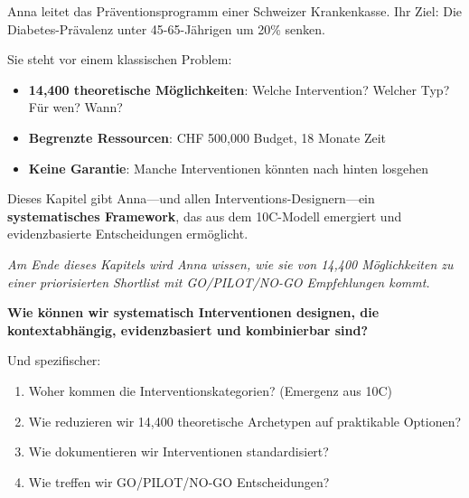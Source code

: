 \begin{tcolorbox}[colback=yellow!5!white, colframe=yellow!75!black,
    title=Intuition: Anna und das Interventions-Dilemma]

Anna leitet das Präventionsprogramm einer Schweizer Krankenkasse. Ihr Ziel: Die Diabetes-Prävalenz unter 45-65-Jährigen um 20\% senken.

Sie steht vor einem klassischen Problem:
\begin{itemize}[nosep]
\item \textbf{14,400 theoretische Möglichkeiten}: Welche Intervention? Welcher Typ? Für wen? Wann?
\item \textbf{Begrenzte Ressourcen}: CHF 500,000 Budget, 18 Monate Zeit
\item \textbf{Keine Garantie}: Manche Interventionen könnten nach hinten losgehen
\end{itemize}

Dieses Kapitel gibt Anna---und allen Interventions-Designern---ein \textbf{systematisches Framework}, das aus dem 10C-Modell emergiert und evidenzbasierte Entscheidungen ermöglicht.

\textit{Am Ende dieses Kapitels wird Anna wissen, wie sie von 14,400 Möglichkeiten zu einer priorisierten Shortlist mit GO/PILOT/NO-GO Empfehlungen kommt.}
\end{tcolorbox}

\begin{tcolorbox}[colback=red!5!white, colframe=red!75!black,
    title=Die Zentrale Frage]
\textbf{Wie können wir systematisch Interventionen designen, die kontextabhängig, evidenzbasiert und kombinierbar sind?}

Und spezifischer:
\begin{enumerate}[nosep]
\item Woher kommen die Interventionskategorien? (Emergenz aus 10C)
\item Wie reduzieren wir 14,400 theoretische Archetypen auf praktikable Optionen?
\item Wie dokumentieren wir Interventionen standardisiert?
\item Wie treffen wir GO/PILOT/NO-GO Entscheidungen?
\end{enumerate}
\end{tcolorbox}

